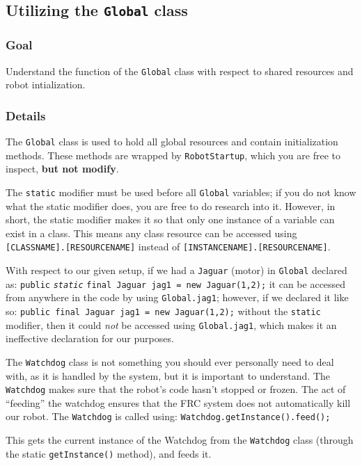 \documentclass[a4paper]{article}
\begin{document}
\pagebreak\subsection{Utilizing the \lstinline{Global} class}
\subsubsection{Goal} Understand the function of the \lstinline{Global} class with respect to shared resources and robot intialization.
\subsubsection{Details} The \lstinline{Global} class is used to hold all global resources and contain initialization methods. These methods are wrapped by \lstinline{RobotStartup}, which you are free to inspect, \textbf{but not modify}.

The \lstinline{static} modifier must be used before all \lstinline{Global} variables; if you do not know what the static modifier does, you are free to do research into it. However, in short, the static modifier makes it so that only one instance of a variable can exist in a class. This means any class resource can be accessed using \lstinline{[CLASSNAME].[RESOURCENAME]} instead of \lstinline{[INSTANCENAME].[RESOURCENAME]}.

With respect to our given setup, if we had a \lstinline{Jaguar} (motor) in \lstinline{Global} declared as: \lstinline{public} \textit{\lstinline{static}} \lstinline{final Jaguar jag1 = new Jaguar(1,2);} it can be accessed from anywhere in the code by using \lstinline{Global.jag1}; however, if we declared it like so: \lstinline{public final Jaguar jag1 = new Jaguar(1,2);} without the \lstinline{static} modifier, then it could \textit{not} be accessed using \lstinline{Global.jag1}, which makes it an ineffective declaration for our purposes.

The \lstinline{Watchdog} class is not something you should ever personally need to deal with, as it is handled by the system, but it is important to understand. The \lstinline{Watchdog} makes sure that the robot's code hasn't stopped or frozen. The act of ``feeding'' the watchdog ensures that the FRC system does not automatically kill our robot. The \lstinline{Watchdog} is called using: \lstinline{Watchdog.getInstance().feed();}

This gets the current instance of the Watchdog from the \lstinline{Watchdog} class (through the static \lstinline{getInstance()} method), and feeds it.
\end{document}
